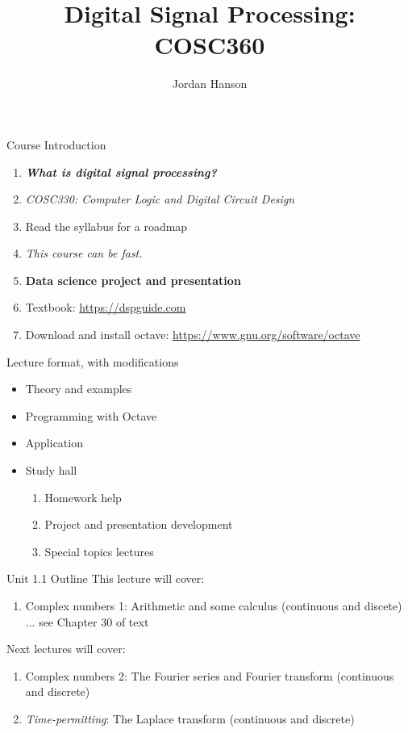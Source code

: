 \documentclass{beamer}
\title{Digital Signal Processing: COSC360}
\author{Jordan Hanson}
\institute{Whittier College Department of Physics and Astronomy}
\begin{document}
\maketitle

\begin{frame}{Course Introduction}
\begin{enumerate}
\item\textit{ \textbf{\alert{What is digital signal processing?}}}
\item \textit{COSC330: Computer Logic and Digital Circuit Design}
\item Read the syllabus for a roadmap
\item \textit{This course can be fast.}
\item \textbf{Data science project and presentation}
\item Textbook: \url{https://dspguide.com}
\item Download and install octave: \url{https://www.gnu.org/software/octave}
\end{enumerate}
\end{frame}

\begin{frame}{Lecture format, with modifications}
\begin{itemize}
\item Theory and examples
\item Programming with Octave
\item Application
\item Study hall
\begin{enumerate}
\item Homework help
\item Project and presentation development
\item Special topics lectures
\end{enumerate}
\end{itemize}
\end{frame}

\begin{frame}{Unit 1.1 Outline}
This lecture will cover:
\begin{enumerate}
\item \alert{Complex numbers 1: Arithmetic and some calculus (continuous and discete) ... see Chapter 30 of text}
\end{enumerate}
Next lectures will cover:
\begin{enumerate}
\item Complex numbers 2: The Fourier series and Fourier transform (continuous and discrete)
\item \textit{Time-permitting}: The Laplace transform (continuous and discrete)
\end{enumerate}
\end{frame}
\end{document}
